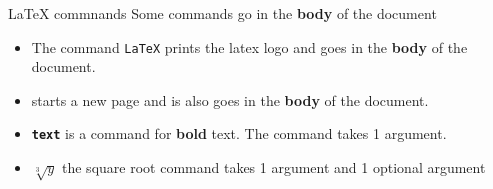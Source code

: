 \copyrightTim

\begin{frame}[fragile]{LaTeX commnands}
    Some commands go in the \textbf{body} of the document
    \newline
    \begin{itemize}
    \item The command \texttt{\LaTeX} prints the latex logo and goes in the \textbf{body} of the document. \newline

    \item \texttt{\newpage} starts a new page and is also goes in the \textbf{body} of the document.
    \newline

    \item \texttt{\textbf{text}} is a command for \textbf{bold} text. The command takes 1 argument.
    \newline
    \item \texttt{}  \(\sqrt[3]{y}\) the square root command takes 1 argument and 1 optional argument
    \end{itemize}
\end{frame}